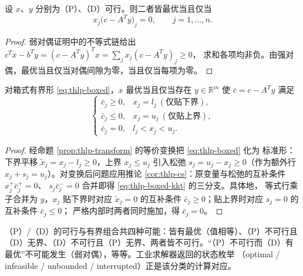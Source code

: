 \begin{corollary}[互补松弛]\label{cor:thlp-cs}
设 $x$、$y$ 分别为（P）、（D）可行。则二者皆最优当且仅当
\begin{equation}\label{eq:thlp-cs}
  x_j\bigl(c-A^{T}y\bigr)_j=0,\qquad j=1,\dots,n .
\end{equation}
\end{corollary}

\begin{proof}
弱对偶证明中的不等式链给出
$c^{T}x-b^{T}y=(c-A^{T}y)^{T}x=\sum_j x_j(c-A^{T}y)_j\ge0$，
求和各项均非负。由强对偶，最优当且仅当对偶间隙为零，当且仅当每项为零。
\end{proof}

\begin{proposition}[箱式有界形的最优性条件]\label{prop:thlp-boxed-kkt}
对箱式有界形 \eqref{eq:thlp-boxed}，$x$ 最优当且仅当存在
$y\in\mathbb{R}^m$ 使 $\bar c=c-A^{T}y$ 满足
\begin{equation}\label{eq:thlp-boxed-kkt}
  \begin{cases}
    \bar c_j\ge0, & x_j=l_j\ (\text{仅贴下界}),\\
    \bar c_j\le0, & x_j=u_j\ (\text{仅贴上界}),\\
    \bar c_j=0, & l_j<x_j<u_j .
  \end{cases}
\end{equation}
\end{proposition}

\begin{proof}
经命题 \ref{prop:thlp-transform} 的等价变换把 \eqref{eq:thlp-boxed} 化为
标准形：下界平移 $\tilde x_j=x_j-l_j\ge0$，上界 $x_j\le u_j$ 引入松弛
$s_j=u_j-x_j\ge0$（作为额外行 $x_j+s_j=u_j$）。对变换后问题应用推论
\ref{cor:thlp-cs}：原变量与松弛的互补条件 $x_j^{+}\bar c_j^{+}=0$、
$s_j\bar c_j^{-}=0$ 合并即得 \eqref{eq:thlp-boxed-kkt} 的三分支。具体地，
等式行乘子合并为 $y$，$x_j$ 贴下界时对应 $\tilde x_j=0$ 的互补条件
$\bar c_j\ge0$；贴上界时对应 $s_j=0$ 的互补条件 $\bar c_j\le0$；
严格内部时两者同时施加，得 $\bar c_j=0$。
\end{proof}

\begin{remark}\label{rem:thlp-duality-cases}
（P）/（D）的可行与有界组合共四种可能：皆有最优（值相等）、（P）不可行且
（D）无界、（D）不可行且（P）无界、两者皆不可行。``（P）不可行而（D）有
最优''不可能发生（弱对偶），等等。工业求解器返回的状态枚举
（optimal / infeasible / unbounded / interrupted）正是该分类的计算对应。
\end{remark}

